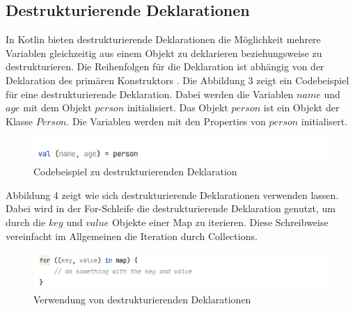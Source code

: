 \documentclass{article}
\begin{document}
\subsection{Destrukturierende Deklarationen}
In Kotlin bieten destrukturierende Deklarationen die Möglichkeit mehrere Variablen gleichzeitig aus einem Objekt zu deklarieren beziehungsweise zu destrukturieren. Die Reihenfolgen für die Deklaration ist abhängig von der Deklaration des primären Konstruktors \cite{KotlinLangDestructuringDeclaratation}. Die Abbildung 3 zeigt ein Codebeispiel für eine destrukturierende Deklaration. Dabei werden die Variablen $name$ und $age$ mit dem Objekt $person$ initialisiert. Das Objekt $person$ ist ein Objekt der Klasse $Person$. Die Variablen werden mit den Properties von $person$ initialisert.
\begin{figure}[!htb]
    \raggedright
    \includegraphics[width=0.9\linewidth]{img/destr_1.png}
    \caption{Codebeispiel zu destrukturierenden Deklaration\footnotemark}
\end{figure}
\newline
Abbildung 4 zeigt wie sich destrukturierende Deklarationen verwenden lassen. Dabei wird in der For-Schleife die destrukturierende Deklaration genutzt, um durch die $key$ und $value$ Objekte einer Map zu iterieren. Diese Schreibweise vereinfacht im Allgemeinen die Iteration durch Collections.
\begin{figure}[!htb]
    \raggedright
    \includegraphics[width=\linewidth]{img/destr_2.png}
    \caption{Verwendung von destrukturierenden Deklarationen \footnotemark}
\end{figure}
\end{document}
